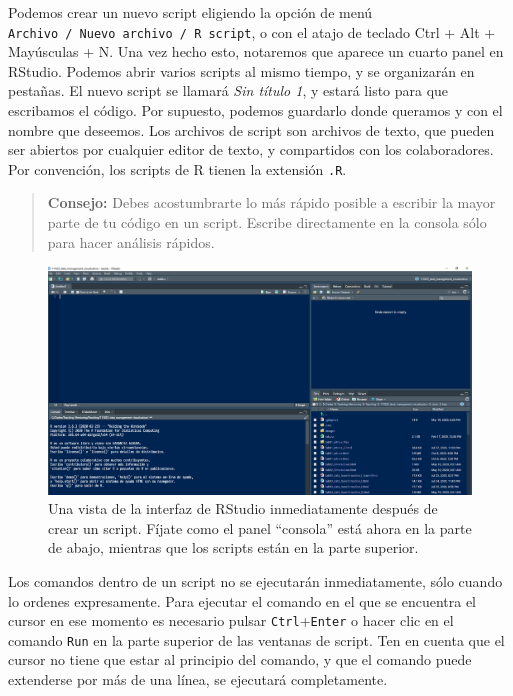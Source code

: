 \documentclass[
  letterpaper,
  DIV=11,
  numbers=noendperiod]{scrreprt}
\begin{document}
Podemos crear un nuevo script eligiendo la opción de menú
\texttt{Archivo\ /\ Nuevo\ archivo\ /\ R\ script}, o con el atajo de
teclado Ctrl + Alt + Mayúsculas + N. Una vez hecho esto, notaremos que
aparece un cuarto panel en RStudio. Podemos abrir varios scripts al
mismo tiempo, y se organizarán en pestañas. El nuevo script se llamará
\emph{Sin título 1}, y estará listo para que escribamos el código. Por
supuesto, podemos guardarlo donde queramos y con el nombre que deseemos.
Los archivos de script son archivos de texto, que pueden ser abiertos
por cualquier editor de texto, y compartidos con los colaboradores. Por
convención, los scripts de R tienen la extensión \texttt{.R}.

\begin{quote}
\textbf{Consejo:} Debes acostumbrarte lo más rápido posible a escribir
la mayor parte de tu código en un script. Escribe directamente en la
consola sólo para hacer análisis rápidos.
\end{quote}

\begin{figure}

{\centering \includegraphics{images/01-intro-r/scripts.PNG}

}

\caption{Una vista de la interfaz de RStudio inmediatamente después de
crear un script. Fíjate como el panel ``consola'' está ahora en la parte
de abajo, mientras que los scripts están en la parte superior.}

\end{figure}

Los comandos dentro de un script no se ejecutarán inmediatamente, sólo
cuando lo ordenes expresamente. Para ejecutar el comando en el que se
encuentra el cursor en ese momento es necesario pulsar
\texttt{Ctrl}+\texttt{Enter} o hacer clic en el comando \texttt{Run} en
la parte superior de las ventanas de script. Ten en cuenta que el cursor
no tiene que estar al principio del comando, y que el comando puede
extenderse por más de una línea, se ejecutará completamente.
\end{document}
